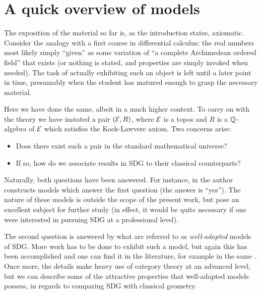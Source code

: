 \chapter{A quick overview of models}

The exposition of the material so far is, as the introduction states, axiomatic. Consider the analogy with a first course in differential calculus; the real numbers most likely simply ``given'' as some variation of ``a complete Archimedean ordered field'' that exists (or nothing is stated, and properties are simply invoked when needed). The task of actually exhibiting such an object is left until a later point in time, presumably when the student has matured enough to grasp the necessary material.

Here we have done the same, albeit in a much higher context. To carry on with the theory we have instated a pair \( (\mathcal{E},R) \), where \( \mathcal{E} \) is a topos and \( R \) is a \( \mathbb{Q} \)-algebra of \( \mathcal{E} \) which satisfies the Kock-Lawvere axiom. Two concerns arise:
\begin{itemize}
  \item Does there exist such a pair in the standard mathematical universe?
  \item If so, how do we associate results in SDG to their classical counterparts?
\end{itemize}

Naturally, both questions have been answered. For instance, in \cite[§III]{kock06} the author constructs models which answer the first question (the answer is ``yes''). The nature of these models is outside the scope of the present work, but pose an excellent subject for further study (in effect, it would be quite necessary if one were interested in pursuing SDG at a professional level).

The second question is answered by what are referred to as \emph{well-adapted} models of SDG. More work has to be done to exhibit such a model, but again this has been accomplished and one can find it in the literature, for example in the same \cite{kock06}. Once more, the details make heavy use of category theory at an advanced level, but we can describe some of the attractive properties that well-adapted models possess, in regards to comparing SDG with classical geometry.


